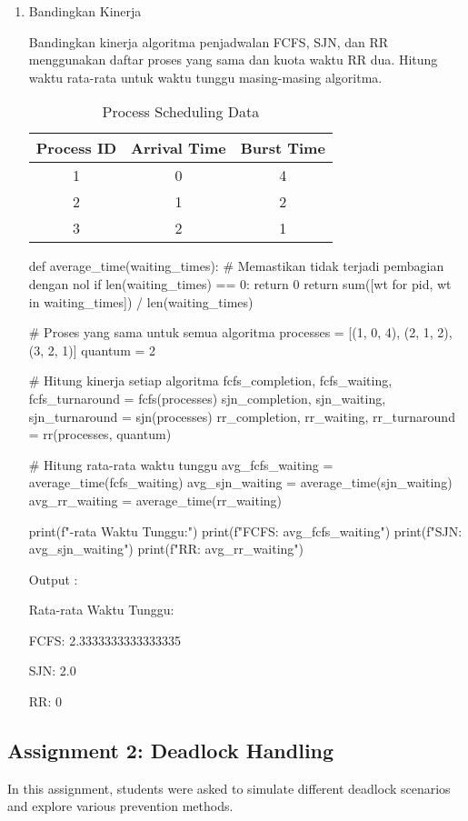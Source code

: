 \documentclass[12pt]{article}
\begin{document}
\begin{enumerate}
    \item Bandingkan Kinerja
        \par  Bandingkan kinerja algoritma penjadwalan FCFS, SJN, dan RR menggunakan daftar proses yang sama dan kuota waktu RR dua. Hitung waktu rata-rata untuk waktu tunggu masing-masing algoritma.
        \begin{table}[h!]
        \centering
        \begin{tabular}{|c|c|c|}
        \hline
        \textbf{Process ID} & \textbf{Arrival Time} & \textbf{Burst Time} \\ \hline
        1 & 0 & 4 \\ \hline
        2 & 1 & 2 \\ \hline
        3 & 2 & 1 \\ \hline
        \end{tabular}
        \caption{Process Scheduling Data}
        \end{table}
        
\begin{python}
def average_time(waiting_times):
    # Memastikan tidak terjadi pembagian dengan nol
    if len(waiting_times) == 0:
        return 0
    return sum([wt for pid, wt in waiting_times]) / len(waiting_times)

# Proses yang sama untuk semua algoritma
processes = [(1, 0, 4), (2, 1, 2), (3, 2, 1)]
quantum = 2

# Hitung kinerja setiap algoritma
fcfs_completion, fcfs_waiting, fcfs_turnaround = fcfs(processes)
sjn_completion, sjn_waiting, sjn_turnaround = sjn(processes)
rr_completion, rr_waiting, rr_turnaround = rr(processes, quantum)

# Hitung rata-rata waktu tunggu
avg_fcfs_waiting = average_time(fcfs_waiting)
avg_sjn_waiting = average_time(sjn_waiting)
avg_rr_waiting = average_time(rr_waiting)

print(f"\nRata-rata Waktu Tunggu:")
print(f"FCFS: {avg_fcfs_waiting}")
print(f"SJN: {avg_sjn_waiting}")
print(f"RR: {avg_rr_waiting}")
\end{python}
        Output : 
        \par Rata-rata Waktu Tunggu:
        \par FCFS: 2.3333333333333335
        \par SJN: 2.0
        \par RR: 0
\end{enumerate}

\subsection{Assignment 2: Deadlock Handling}
In this assignment, students were asked to simulate different deadlock scenarios and explore various prevention methods.
\end{document}
